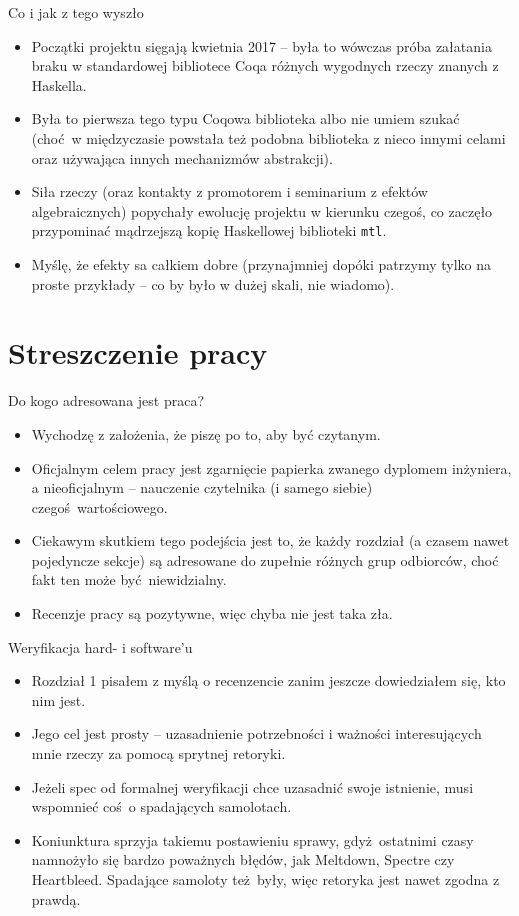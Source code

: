 \documentclass{beamer}
\begin{document}
\begin{frame}{Co i jak z tego wyszło}
\begin{itemize}
	\item Początki projektu sięgają kwietnia 2017 -- była to wówczas próba załatania braku w standardowej bibliotece Coqa różnych wygodnych rzeczy znanych z Haskella.
	\item Była to pierwsza tego typu Coqowa biblioteka albo nie umiem szukać (choć w międzyczasie powstała też podobna biblioteka z nieco innymi celami oraz używająca innych mechanizmów abstrakcji).
	\item Siła rzeczy (oraz kontakty z promotorem i seminarium z efektów algebraicznych) popychały ewolucję projektu w kierunku czegoś, co zaczęło przypominać mądrzejszą kopię Haskellowej biblioteki \texttt{mtl}.
	\item Myślę, że efekty sa całkiem dobre (przynajmniej dopóki patrzymy tylko na proste przykłady -- co by było w dużej skali, nie wiadomo).
\end{itemize}
\end{frame}

\section{Streszczenie pracy}

\begin{frame}{Do kogo adresowana jest praca?}
\begin{itemize}
	\item Wychodzę z założenia, że piszę po to, aby być czytanym.
	\item Oficjalnym celem pracy jest zgarnięcie papierka zwanego dyplomem inżyniera, a nieoficjalnym -- nauczenie czytelnika (i samego siebie) czegoś wartościowego.
	\item Ciekawym skutkiem tego podejścia jest to, że każdy rozdział (a czasem nawet pojedyncze sekcje) są adresowane do zupełnie różnych grup odbiorców, choć fakt ten może być niewidzialny.
	\item Recenzje pracy są pozytywne, więc chyba nie jest taka zła.
\end{itemize}
\end{frame}

\begin{frame}{Weryfikacja hard- i software'u}
\begin{itemize}
	\item Rozdział 1 pisałem z myślą o recenzencie zanim jeszcze dowiedziałem się, kto nim jest.
	\item Jego cel jest prosty -- uzasadnienie potrzebności i ważności interesujących mnie rzeczy za pomocą sprytnej retoryki.
	\item Jeżeli spec od formalnej weryfikacji chce uzasadnić swoje istnienie, musi wspomnieć coś o spadających samolotach.
	\item Koniunktura sprzyja takiemu postawieniu sprawy, gdyż ostatnimi czasy namnożyło się bardzo poważnych błędów, jak Meltdown, Spectre czy Heartbleed. Spadające samoloty też były, więc retoryka jest nawet zgodna z prawdą.
\end{itemize}
\end{frame}
\end{document}
